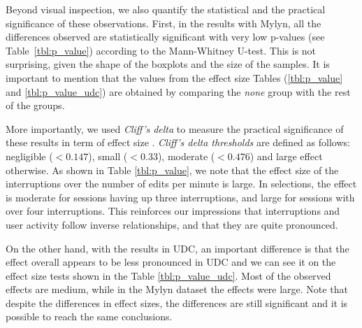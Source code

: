 \documentclass[times]{smrauth}
\begin{document}
Beyond visual inspection, we also quantify the statistical and the practical significance of these observations. First, in the results with Mylyn, all the differences observed are statistically significant with very low p-values (see Table~\ref{tbl:p_value}) according to the Mann-Whitney U-test. This is not surprising, given the shape of the boxplots and the size of the samples. It is important to mention that the values from the effect size Tables (\ref{tbl:p_value} and \ref{tbl:p_value_udc}) are obtained by comparing the \textit{none} group with the rest of the groups.

More importantly, we used \textit{Cliff's delta} to measure the practical significance of these results in term of effect size %
\cite{C94}. \textit{Cliff's delta thresholds} are defined as follows: negligible ($<0.147$), small  ($<0.33$), moderate ($<0.476$) and large effect otherwise. As shown in Table \ref{tbl:p_value}, we note that the effect size of the interruptions over the number of edits per minute is large. In selections, the effect is moderate for sessions having up three interruptions, and large for sessions with over four interruptions. This reinforces our impressions that interruptions and user activity follow inverse relationships, and that they are quite pronounced.

On the other hand, with the results in UDC, an important difference is that the effect overall appears to be less pronounced in UDC and we can see it on the effect size tests shown in the Table \ref{tbl:p_value_udc}. Most of the observed effects are medium, while in the Mylyn dataset the effects were large. Note that despite the differences in effect sizes, the differences are still significant and it is possible to reach the same conclusions.

\end{document}
